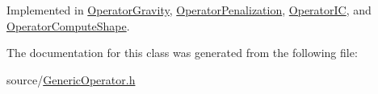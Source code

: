 Implemented in \hyperlink{class_operator_gravity_a7829a016bf4b27c2213493e363515c90}{Operator\+Gravity}, \hyperlink{class_operator_penalization_a55a7fe1ef7cfa3c48c98b0145cd24f00}{Operator\+Penalization}, \hyperlink{class_operator_i_c_adf547defe5168b4bb0181df741a71144}{Operator\+I\+C}, and \hyperlink{class_operator_compute_shape_ad9d3edd854162a93b5c7212bd694e73a}{Operator\+Compute\+Shape}.



The documentation for this class was generated from the following file\+:\begin{DoxyCompactItemize}
\item 
source/\hyperlink{_generic_operator_8h}{Generic\+Operator.\+h}\end{DoxyCompactItemize}
